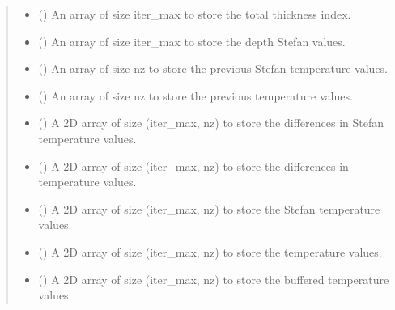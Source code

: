 \documentclass[a4paper,11pt,english,openany]{sphinxmanual}
\begin{document}
\begin{fulllineitems}
\begin{quote}
\begin{description}
\begin{itemize}
\item {} 
\sphinxAtStartPar
{} () \textendash{} An array of size iter\_max to store the total thickness index.

\item {} 
\sphinxAtStartPar
{} () \textendash{} An array of size iter\_max to store the depth Stefan values.

\item {} 
\sphinxAtStartPar
{} () \textendash{} An array of size nz to store the previous Stefan temperature values.

\item {} 
\sphinxAtStartPar
{} () \textendash{} An array of size nz to store the previous temperature values.

\item {} 
\sphinxAtStartPar
{} () \textendash{} A 2D array of size (iter\_max, nz) to store the differences in Stefan temperature values.

\item {} 
\sphinxAtStartPar
{} () \textendash{} A 2D array of size (iter\_max, nz) to store the differences in temperature values.

\item {} 
\sphinxAtStartPar
{} () \textendash{} A 2D array of size (iter\_max, nz) to store the Stefan temperature values.

\item {} 
\sphinxAtStartPar
{} () \textendash{} A 2D array of size (iter\_max, nz) to store the temperature values.

\item {} 
\sphinxAtStartPar
{} () \textendash{} A 2D array of size (iter\_max, nz) to store the buffered temperature values.


\end{itemize}
\end{description}
\end{quote}
\end{fulllineitems}
\end{document}
